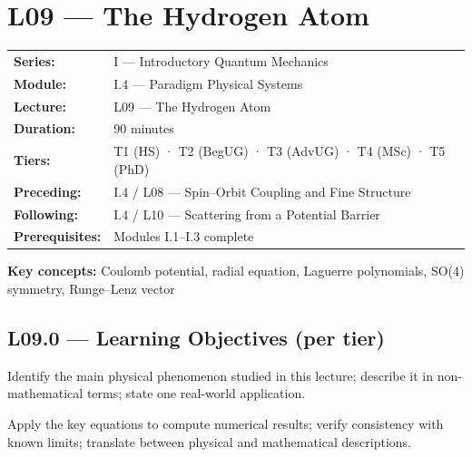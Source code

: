 \renewcommand{\lectureCode}{I.4 / L09}

\section*{L09 — The Hydrogen Atom}
\label{sec:L09}

\begin{tcolorbox}[lecturebox, title={Module I.4 / L09 — Metadata}]
\begin{tabular}{@{}ll@{}}
\textbf{Series:}    & I — Introductory Quantum Mechanics \\
\textbf{Module:}    & I.4 — Paradigm Physical Systems \\
\textbf{Lecture:}   & L09 — The Hydrogen Atom \\
\textbf{Duration:}  & 90 minutes \\
\textbf{Tiers:}     & T1 (HS) · T2 (BegUG) · T3 (AdvUG) · T4 (MSc) · T5 (PhD) \\
\textbf{Preceding:} & I.4 / L08 — Spin–Orbit Coupling and Fine Structure \\
\textbf{Following:} & I.4 / L10 — Scattering from a Potential Barrier \\
\textbf{Prerequisites:} & Modules I.1–I.3 complete \\
\end{tabular}

\medskip
\textbf{Key concepts:} Coulomb potential, radial equation, Laguerre polynomials, SO(4) symmetry, Runge–Lenz vector
\end{tcolorbox}

\subsection*{L09.0 — Learning Objectives (per tier)}
\label{sec:L09.0}

\quad
Identify the main physical phenomenon studied in this lecture; describe it in
non-mathematical terms; state one real-world application.

\quad
Apply the key equations to compute numerical results; verify consistency with
known limits; translate between physical and mathematical descriptions.

